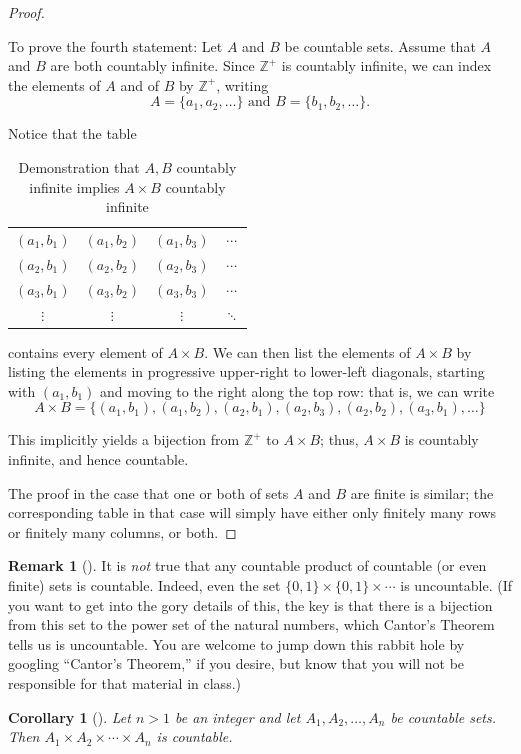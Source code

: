 \documentclass[10pt,]{book}
\theoremstyle{plain}
\newtheorem{corollary}[theorem]{Corollary}
\theoremstyle{definition}
\theoremstyle{definition}
\newtheorem{remark}[theorem]{Remark}
\theoremstyle{definition}
\theoremstyle{definition}
\numberwithin{equation}{section}
\def\Z{\mathbb{Z}}
\begin{document}
\begin{proof}\hypertarget{proof-4}{}
To prove the fourth statement: Let \(A\) and \(B\) be countable sets. Assume that \(A\) and \(B\) are both countably infinite. Since \(\Z^+\) is countably infinite, we can index the elements of \(A\) and of \(B\) by \(\Z^+\), writing%
\begin{equation*}
A=\{a_1,a_2,\ldots\} \mbox{ and }  B=\{b_1,b_2,\ldots\}.
\end{equation*}
%
\par
Notice that the table%
\begin{table}
\centering
\begin{tabular}{cccc}
\((a_1,b_1)\)&\((a_1,b_2)\)&\((a_1,b_3)\)&\(\cdots\)\tabularnewline[0pt]
\((a_2,b_1)\)&\((a_2,b_2)\)&\((a_2,b_3)\)&\(\cdots\)\tabularnewline[0pt]
\((a_3,b_1)\)&\((a_3,b_2)\)&\((a_3,b_3)\)&\(\cdots\)\tabularnewline[0pt]
\(\vdots\)&\(\vdots\)&\(\vdots\)&\(\ddots\)
\end{tabular}
\caption{Demonstration that \(A,B\) countably infinite implies \(A\times B\) countably infinite\label{prodctb}}
\end{table}
contains every element of \(A\times B\). We can then list the elements of \(A\times B\) by listing the elements in progressive upper-right to lower-left diagonals, starting with \((a_1,b_1)\) and moving to the right along the top row: that is, we can write%
\begin{equation*}
A\times B=\{(a_1,b_1),(a_1,b_2),(a_2,b_1),(a_2,b_3),(a_2,b_2),(a_3,b_1),\ldots\}
\end{equation*}
%
\par
This implicitly yields a bijection from \(\Z^+\) to \(A\times B\); thus, \(A\times B\) is countably infinite, and hence countable.%
\par
The proof in the case that one or both of sets \(A\) and \(B\) are finite is similar; the corresponding table in that case will simply have either only finitely many rows or finitely many columns, or both.%
\end{proof}
\begin{remark}[]\label{remark-4}
It is \emph{not} true that any countable product of countable (or even finite) sets is countable. Indeed, even the set \(\{0,1\}\times \{0,1\}\times \cdots\) is uncountable. (If you want to get into the gory details of this, the key is that there is a bijection from this set to the power set of the natural numbers, which Cantor's Theorem tells us is uncountable.  You are welcome to jump down this rabbit hole by googling ``Cantor's Theorem,'' if you desire, but know that you will not be responsible for that material in class.)%
\end{remark}
\begin{corollary}[{}]\label{corollary-1}
Let \(n>1\) be an integer and let \(A_1,A_2,\ldots, A_n\) be countable sets. Then \(A_1\times A_2\times \cdots \times A_n\) is countable.%
\end{corollary}
\typeout{************************************************}
\typeout{************************************************}
\end{document}
